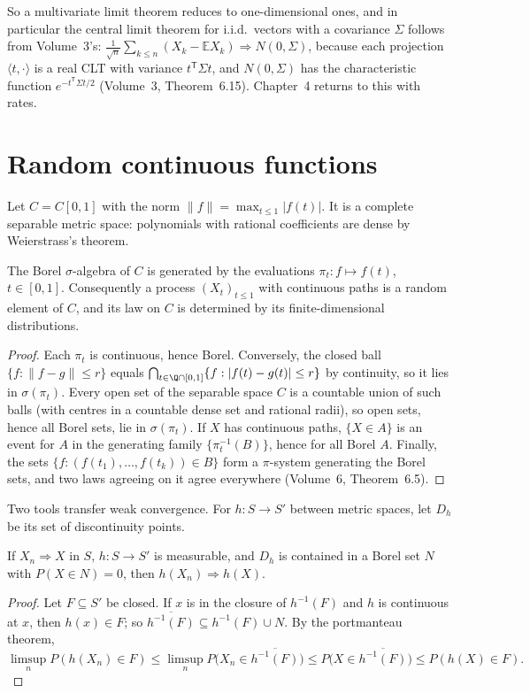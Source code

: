 So a multivariate limit theorem reduces to one-dimensional ones, and in particular the central limit theorem for i.i.d.\ vectors with a covariance
$\Sigma$ follows from Volume~3's: $\frac1{\sqrt n}\sum_{k\le n}(X_k-\mathbb E X_k)\Rightarrow N(0,\Sigma)$, because each projection $\langle t,\cdot\rangle$ is a real
CLT with variance $t^{\mathsf T}\Sigma t$, and $N(0,\Sigma)$ has the characteristic function $e^{-t^{\mathsf T}\Sigma t/2}$ (Volume~3, Theorem~6.15). Chapter~4
returns to this with rates.

\section{Random continuous functions}

Let $C=C[0,1]$ with the norm $\|f\|=\max_{t\le1}|f(t)|$. It is a complete separable metric space: polynomials with rational coefficients are dense by
Weierstrass's theorem.

\begin{lemma}\label{lem:cborel}
The Borel $\sigma$-algebra of $C$ is generated by the evaluations $\pi_t:f\mapsto f(t)$, $t\in[0,1]$. Consequently a process $(X_t)_{t\le1}$ with continuous paths
is a random element of $C$, and its law on $C$ is determined by its finite-dimensional distributions.
\end{lemma}
\begin{proof}
Each $\pi_t$ is continuous, hence Borel. Conversely, the closed ball $\{f:\|f-g\|\le r\}$ equals $\bigcap_{t\in\Q\cap[0,1]}\{f:|f(t)-g(t)|\le r\}$ by continuity,
so it lies in $\sigma(\pi_t)$. Every open set of the separable space $C$ is a countable union of such balls (with centres in a countable dense set and rational
radii), so open sets, hence all Borel sets, lie in $\sigma(\pi_t)$. If $X$ has continuous paths, $\{X\in A\}$ is an event for $A$ in the generating family
$\{\pi_t^{-1}(B)\}$, hence for all Borel $A$. Finally, the sets $\{f:(f(t_1),\dots,f(t_k))\in B\}$ form a $\pi$-system generating the Borel sets, and two laws
agreeing on it agree everywhere (Volume~6, Theorem~6.5).
\end{proof}

Two tools transfer weak convergence. For $h:S\to S'$ between metric spaces, let $D_h$ be its set of discontinuity points.

\begin{proposition}\label{prop:contmap}
If $X_n\Rightarrow X$ in $S$, $h:S\to S'$ is measurable, and $D_h$ is contained in a Borel set $N$ with $P(X\in N)=0$, then $h(X_n)\Rightarrow h(X)$.
\end{proposition}
\begin{proof}
Let $F\subseteq S'$ be closed. If $x$ is in the closure of $h^{-1}(F)$ and $h$ is continuous at $x$, then $h(x)\in F$; so $\overline{h^{-1}(F)}\subseteq h^{-1}(F)\cup N$. By
the portmanteau theorem,
\[
\limsup_nP(h(X_n)\in F)\le\limsup_nP\bigl(X_n\in\overline{h^{-1}(F)}\bigr)\le P\bigl(X\in\overline{h^{-1}(F)}\bigr)\le P(h(X)\in F).
\]
\end{proof}


